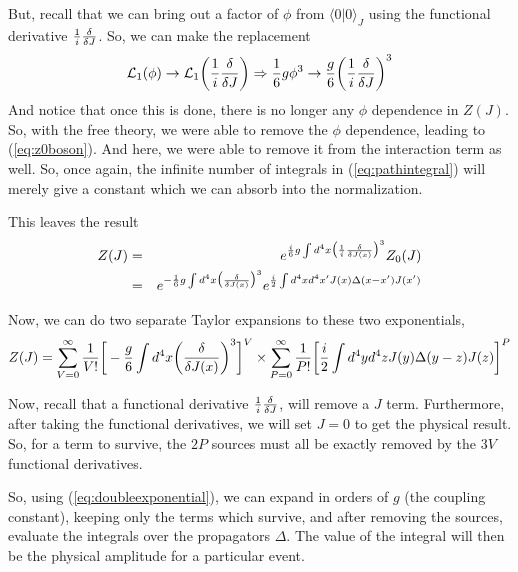 \documentclass[12pt,epsf]{article}
\def\nolabel{\nonumber }
\def\nolabel{\nonumber }
\begin{document}
But, recall that we can bring out a factor of $\phi$ from $\langle 0 |
0 \rangle_J$ using the functional derivative ${1\over i} {\delta \over
\delta J}$.  So, we can make the replacement
\begin{eqnarray}
\mathcal{L}_1(\phi) \rightarrow \mathcal{L}_1\bigg({1\over i}{\delta
\over \delta J}\bigg) \Rightarrow {1\over 6} g \phi^3  \rightarrow {g
\over 6}\bigg({1\over i}{\delta \over \delta J}\bigg)^3\nolabel
\end{eqnarray}
And notice that once this is done, there is no longer any $\phi$
dependence in $Z(J)$.  So, with the free theory, we were able to remove
the $\phi$ dependence, leading to (\ref{eq:z0boson}).  And here, we
were able to remove it from the interaction term as well.  So, once
again, the infinite number of integrals in (\ref{eq:pathintegral}) will
merely give a constant which we can absorb into the normalization.  

This leaves the result
\begin{eqnarray}
Z(J) &=& e^{{i\over 6}g \int d^4x \big({1\over i}{\delta \over \delta
J(x)}\big)^3}Z_0(J) \nolabel \\
&=& e^{-{1\over 6} g \int d^4x \big({\delta \over \delta
J(x)}\big)^3}e^{{i \over 2} \int d^4x d^4x' J(x)
\Delta(x-x')J(x')}\nolabel
\end{eqnarray}

Now, we can do two separate Taylor expansions to these two
exponentials, 
\begin{eqnarray}
Z(J) = \sum_{V=0}^{\infty} {1\over V!} \bigg[-{g\over 6} \int d^4x
\bigg({\delta \over \delta J(x)}\bigg)^3 \bigg]^V \times
\sum_{P=0}^{\infty}{1\over P!}\bigg[{i\over 2} \int
d^4yd^4zJ(y)\Delta(y-z)J(z)\bigg]^P \nolabel \\
\label{eq:doubleexponential}
\end{eqnarray}

Now, recall that a functional derivative ${1\over i} {\delta \over
\delta J}$, will remove a $J$ term.  Furthermore, after taking the
functional derivatives, we will set $J=0$ to get the physical result. 
So, for a term to survive, the $2P$ sources must all be exactly removed
by the $3V$ functional derivatives.  

So, using (\ref{eq:doubleexponential}), we can expand in orders of $g$
(the coupling constant), keeping only the terms which survive, and
after removing the sources, evaluate the integrals over the propagators
$\Delta$.  The value of the integral will then be the physical
amplitude for a particular event.  
\end{document}
